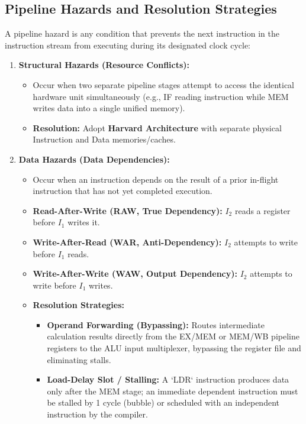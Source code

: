 \documentclass[12pt,a4paper]{article}
\begin{document}
\subsection{Pipeline Hazards and Resolution Strategies}
A pipeline hazard is any condition that prevents the next instruction in the instruction stream from executing during its designated clock cycle:
\begin{enumerate}[leftmargin=*]
  \item \textbf{Structural Hazards (Resource Conflicts):}
  \begin{itemize}[leftmargin=*]
    \item Occur when two separate pipeline stages attempt to access the identical hardware unit simultaneously (e.g., IF reading instruction while MEM writes data into a single unified memory).
    \item \textbf{Resolution:} Adopt \textbf{Harvard Architecture} with separate physical Instruction and Data memories/caches.
  \end{itemize}
  \item \textbf{Data Hazards (Data Dependencies):}
  \begin{itemize}[leftmargin=*]
    \item Occur when an instruction depends on the result of a prior in-flight instruction that has not yet completed execution.
    \item \textbf{Read-After-Write (RAW, True Dependency):} $I_2$ reads a register before $I_1$ writes it.
    \item \textbf{Write-After-Read (WAR, Anti-Dependency):} $I_2$ attempts to write before $I_1$ reads.
    \item \textbf{Write-After-Write (WAW, Output Dependency):} $I_2$ attempts to write before $I_1$ writes.
    \item \textbf{Resolution Strategies:}
    \begin{itemize}[leftmargin=*]
      \item \textbf{Operand Forwarding (Bypassing):} Routes intermediate calculation results directly from the EX/MEM or MEM/WB pipeline registers to the ALU input multiplexer, bypassing the register file and eliminating stalls.
      \item \textbf{Load-Delay Slot / Stalling:} A `LDR` instruction produces data only after the MEM stage; an immediate dependent instruction must be stalled by 1 cycle (bubble) or scheduled with an independent instruction by the compiler.
    \end{itemize}
  \end{itemize}

\end{enumerate}
\end{document}

